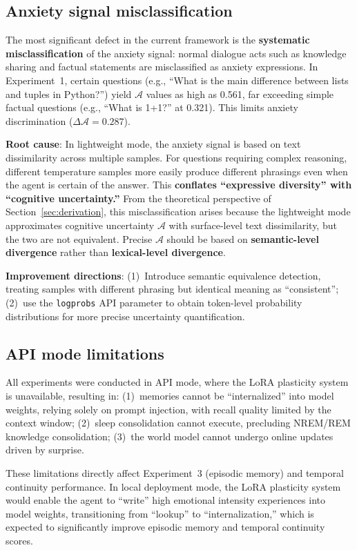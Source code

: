 \documentclass[pdflatex,sn-mathphys-num]{sn-jnl}
\newcommand{\anxiety}{\mathcal{A}}
\theoremstyle{thmstyleone}%
\theoremstyle{thmstyletwo}%
\theoremstyle{thmstylethree}%
\begin{document}
\subsection{Anxiety signal misclassification}

The most significant defect in the current framework is the \textbf{systematic misclassification} of the anxiety signal: normal dialogue acts such as knowledge sharing and factual statements are misclassified as anxiety expressions. In Experiment~1, certain questions (e.g., ``What is the main difference between lists and tuples in Python?'') yield $\anxiety$ values as high as 0.561, far exceeding simple factual questions (e.g., ``What is 1+1?'' at 0.321). This limits anxiety discrimination ($\Delta\anxiety = 0.287$).

\textbf{Root cause}: In lightweight mode, the anxiety signal is based on text dissimilarity across multiple samples. For questions requiring complex reasoning, different temperature samples more easily produce different phrasings even when the agent is certain of the answer. This \textbf{conflates ``expressive diversity'' with ``cognitive uncertainty.''} From the theoretical perspective of Section~\ref{sec:derivation}, this misclassification arises because the lightweight mode approximates cognitive uncertainty $\anxiety$ with surface-level text dissimilarity, but the two are not equivalent. Precise $\anxiety$ should be based on \textbf{semantic-level divergence} rather than \textbf{lexical-level divergence}.

\textbf{Improvement directions}: (1)~Introduce semantic equivalence detection, treating samples with different phrasing but identical meaning as ``consistent''; (2)~use the \texttt{logprobs} API parameter to obtain token-level probability distributions for more precise uncertainty quantification.

\subsection{API mode limitations}

All experiments were conducted in API mode, where the LoRA plasticity system is unavailable, resulting in: (1)~memories cannot be ``internalized'' into model weights, relying solely on prompt injection, with recall quality limited by the context window; (2)~sleep consolidation cannot execute, precluding NREM/REM knowledge consolidation; (3)~the world model cannot undergo online updates driven by surprise.

These limitations directly affect Experiment~3 (episodic memory) and temporal continuity performance. In local deployment mode, the LoRA plasticity system would enable the agent to ``write'' high emotional intensity experiences into model weights, transitioning from ``lookup'' to ``internalization,'' which is expected to significantly improve episodic memory and temporal continuity scores.
\end{document}
